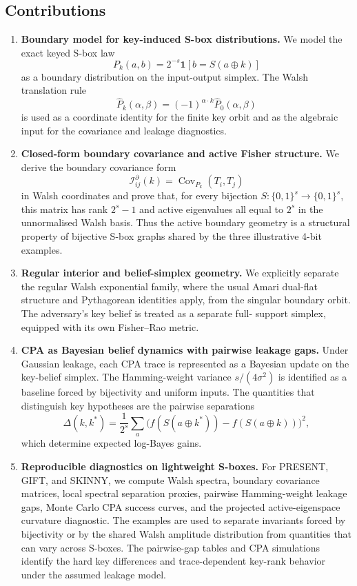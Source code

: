 \documentclass[referee,lineno,pdflatex,sn-mathphys-num]{sn-jnl}
\theoremstyle{thmstylethree}
\theoremstyle{thmstyletwo}
\theoremstyle{thmstyleone}
\newcommand{\B}[1]{\{0,1\}^{#1}}
\begin{document}
\subsection{Contributions}\label{subsec:contributions}

\begin{enumerate}[label=\textbf{C\arabic*.}]

\item \textbf{Boundary model for key-induced S-box distributions.}
We model the exact keyed S-box law
\[
  P_k(a,b)=2^{-s}\mathbf 1[b=S(a\oplus k)]
\]
as a boundary distribution on the input-output simplex.  The Walsh translation
rule
\[
  \widehat P_k(\alpha,\beta)
  =(-1)^{\alpha\cdot k}\widehat P_0(\alpha,\beta)
\]
is used as a coordinate identity for the finite key orbit and as the algebraic
input for the covariance and leakage diagnostics.

\item \textbf{Closed-form boundary covariance and active Fisher structure.}
We derive the boundary covariance form
\[
  \mathcal I^{\partial}_{ij}(k)=\operatorname{Cov}_{P_k}(T_i,T_j)
\]
in Walsh coordinates and prove that, for every bijection $S:\B{s}\to\B{s}$,
this matrix has rank $2^s-1$ and active eigenvalues all equal to $2^s$ in the
unnormalised Walsh basis.  Thus the active boundary geometry is a structural
property of bijective S-box graphs shared by the three illustrative 4-bit
examples.

\item \textbf{Regular interior and belief-simplex geometry.}
We explicitly separate the regular Walsh exponential family, where the usual
Amari dual-flat structure and Pythagorean identities apply, from the singular
boundary orbit.  The adversary's key belief is treated as a separate full-
support simplex, equipped with its own Fisher--Rao metric.

\item \textbf{CPA as Bayesian belief dynamics with pairwise leakage gaps.}
Under Gaussian leakage, each CPA trace is represented as a Bayesian update on
the key-belief simplex.  The Hamming-weight variance
$s/(4\sigma^2)$ is identified as a baseline forced by bijectivity and uniform
inputs.  The quantities that distinguish key hypotheses are the pairwise
separations
\[
  \Delta(k,k^*)=\frac1{2^s}\sum_a
  \bigl(f(S(a\oplus k^*))-f(S(a\oplus k))\bigr)^2,
\]
which determine expected log-Bayes gains.

\item \textbf{Reproducible diagnostics on lightweight S-boxes.}
For PRESENT, GIFT, and SKINNY, we compute Walsh spectra, boundary covariance
matrices, local spectral separation proxies, pairwise Hamming-weight leakage
gaps, Monte Carlo CPA success curves, and the projected active-eigenspace
curvature diagnostic.  The examples
are used to separate invariants forced by bijectivity or by the shared Walsh
amplitude distribution from quantities that can vary across S-boxes.  The
pairwise-gap tables and CPA simulations identify the hard key differences and
trace-dependent key-rank behavior under the assumed leakage model.
\end{enumerate}
\end{document}
